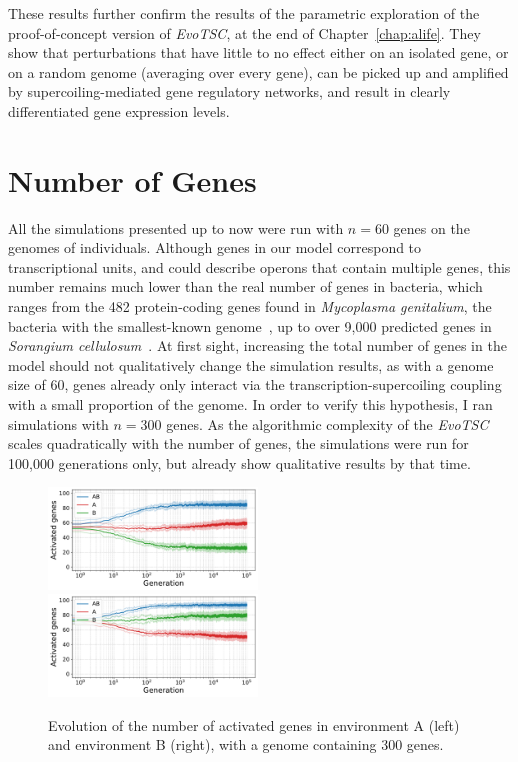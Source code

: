 These results further confirm the results of the parametric exploration of the proof-of-concept version of \emph{EvoTSC}, at the end of Chapter~\ref{chap:alife}.
They show that perturbations that have little to no effect either on an isolated gene, or on a random genome (averaging over every gene), can be picked up and amplified by supercoiling-mediated gene regulatory networks, and result in clearly differentiated gene expression levels.

\FloatBlock


\section{Number of Genes}
\label{sec:param:300-genes}

All the simulations presented up to now were run with $n = 60$ genes on the genomes of individuals.
Although genes in our model correspond to transcriptional units, and could describe operons that contain multiple genes, this number remains much lower than the real number of genes in bacteria, which ranges from the 482 protein-coding genes found in \emph{Mycoplasma genitalium}, the bacteria with the smallest-known genome~\citep{glass2006}, up to over 9,000 predicted genes in \emph{Sorangium cellulosum}~\citep{schneiker2007}.
At first sight, increasing the total number of genes in the model should not qualitatively change the simulation results, as with a genome size of 60, genes already only interact via the transcription-supercoiling coupling with a small proportion of the genome.
In order to verify this hypothesis, I ran simulations with $n = 300$ genes.
As the algorithmic complexity of the \emph{EvoTSC} scales quadratically with the number of genes, the simulations were run for 100,000 generations only, but already show qualitative results by that time.

\begin{figure}[H]
\centering
\includegraphics[width=0.495\textwidth]{param/300-genes/gene_activity_env_A.pdf}
\includegraphics[width=0.495\textwidth]{param/300-genes/gene_activity_env_B.pdf}
\caption[Evolution of the number of activated genes in each environment, with a 300-gene genome]{Evolution of the number of activated genes in environment A (left) and environment B (right), with a genome containing 300 genes.}
\label{fig:param:300genes-activ-by-env}
\end{figure}

